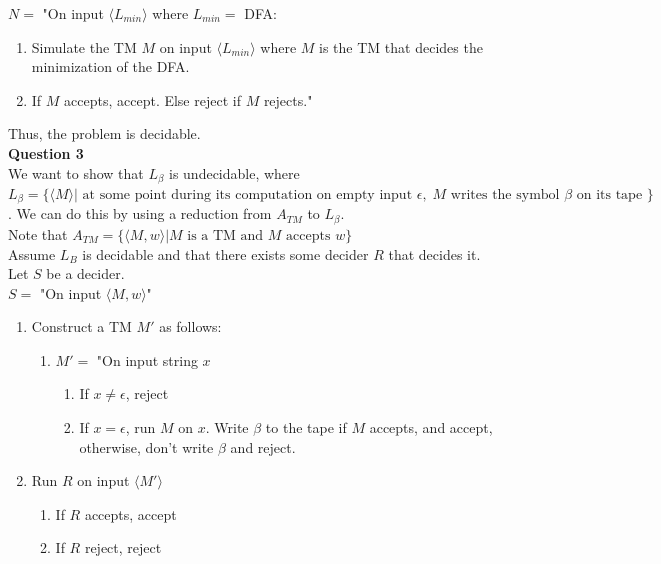 \documentclass{article}
\begin{document}
\bigskip
$N=$ "On input $\langle L_{min} \rangle$ where $L_{min}=$ DFA:
\begin{enumerate}
  \item Simulate the TM $M$ on input $\langle L_{min} \rangle$ where $M$ is the TM that decides the minimization of the DFA.
  \item If $M$ accepts, accept. Else reject if $M$ rejects."
\end{enumerate}

\bigskip
Thus, the problem is decidable.\\

\bigskip
{\bf Question 3}\\
We want to show that $L_{\beta}$ is undecidable, where\\ 
$L_{\beta} = \{ \langle M \rangle | \text{ at some point during its computation on empty input } \epsilon, \; M \text{ writes the symbol } \beta \text{ on its tape }\}$. We can do this by using a reduction from $A_{TM}$ to $L_{\beta}$.\\

Note that $A_{TM} = \{ \langle M, w \rangle | M \text{ is a TM and } M \text{ accepts } w \}$\\

Assume $L_B$ is decidable and that there exists some decider $R$ that decides it.\\

Let $S$ be a decider.\\

$S =$ "On input $\langle M, w \rangle$"
\begin{enumerate}
   \item Construct a TM $M'$ as follows:
   \begin{enumerate}
        \item $M'=$ "On input string $x$
        \begin{enumerate}
            \item  If $x \neq \epsilon$, reject
            \item If $x = \epsilon$, run $M$ on $x$. Write $\beta$ to the tape if $M$ accepts, and accept, otherwise, don't write $\beta$ and reject.
        \end{enumerate}
   \end{enumerate}
   \item Run $R$ on input $\langle M' \rangle$
        \begin{enumerate}
            \item If $R$ accepts, accept
            \item If $R$ reject, reject
        \end{enumerate}
 \end{enumerate}
 
\end{document}
